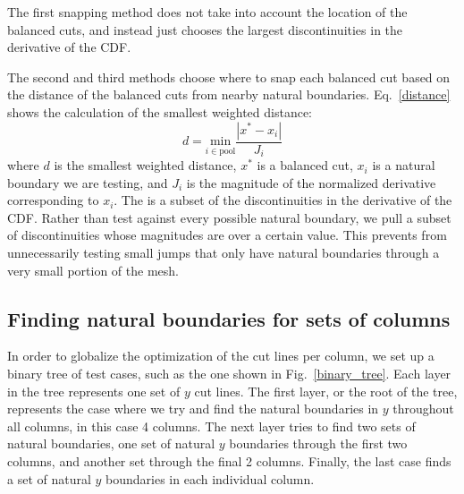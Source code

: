 The first snapping method does not take into account the location of the balanced cuts, and instead just chooses the largest discontinuities in the derivative of the CDF.

The second and third methods choose where to snap each balanced cut based on the distance of the balanced cuts from nearby natural boundaries. Eq.~\ref{distance} shows the calculation of the smallest weighted distance:
\begin{equation}
d = \underset{i \in \text{pool}}{\text{min}} \frac{|x^{*} - x_i|}{J_i}
\label{distance}
\end{equation}
where $d$ is the smallest weighted distance, $x^*$ is a balanced cut, $x_i$ is a natural boundary we are testing, and $J_i$ is the magnitude of the normalized derivative corresponding to $x_i$.
The  is a subset of the discontinuities in the derivative of the CDF.
Rather than test against every possible natural boundary, we pull a subset of discontinuities whose magnitudes are over a certain value.
This prevents from unnecessarily testing small jumps that only have natural boundaries through a very small portion of the mesh.

\FloatBarrier
\subsection{Finding natural boundaries for sets of columns}
In order to globalize the optimization of the cut lines per column, we set up a binary tree of test cases, such as the one shown in Fig.~\ref{binary_tree}. Each layer in the tree represents one set of $y$ cut lines. The first layer, or the root of the tree, represents the case where we try and find the natural boundaries in $y$ throughout all columns, in this case 4 columns. The next layer tries to find two sets of natural boundaries, one set of natural $y$ boundaries through the first two columns, and another set through the final 2 columns. Finally, the last case finds a set of natural $y$ boundaries in each individual column.

